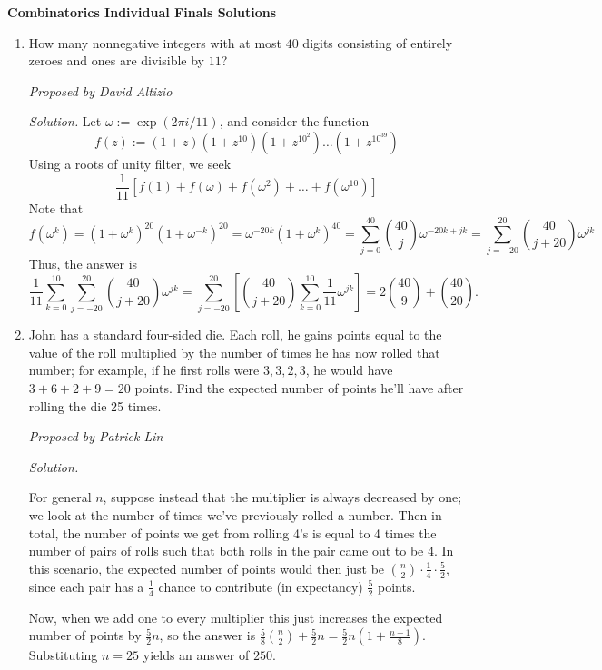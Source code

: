\documentclass[10pt]{article}
\newcommand{\proposed}[1]
{
\vspace{3pt}
\noindent\textit{Proposed by #1}
}
\newcommand{\solution}
{
\vspace{3pt}
\noindent\textit{Solution.}\qquad
}
\begin{document}
\newpage

\begin{center}
\huge\textbf{Combinatorics Individual Finals Solutions}
\end{center} \vspace{3pt}

\begin{enumerate}

\item How many nonnegative integers with at most $40$ digits consisting of entirely zeroes and ones are divisible by $11$?

\proposed{David Altizio}

\solution Let $\omega:=\exp(2\pi i/11)$, and consider the function \[f(z):=(1+z)(1+z^{10})(1+z^{10^2})\dots(1+z^{10^{39}})\] Using a roots of unity filter, we seek \[\frac1{11}\left[f(1)+f(\omega)+f(\omega^2)+\dots+f(\omega^{10})\right]\] Note that \[f(\omega^k)=(1+\omega^k)^{20}(1+\omega^{-k})^{20}=\omega^{-20k}(1+\omega^k)^{40}=\sum_{j=0}^{40}\binom{40}j\omega^{-20k+jk}=\sum_{j=-20}^{20}\binom{40}{j+20}\omega^{jk}\] Thus, the answer is \[\frac1{11}\sum_{k=0}^{10}\sum_{j=-20}^{20}\binom{40}{j+20}\omega^{jk}=\sum_{j=-20}^{20}\left[\binom{40}{j+20}\sum_{k=0}^{10}\frac1{11}\omega^{jk}\right]=\boxed{2\binom{40}{9}+\binom{40}{20}}.\]

\item John has a standard four-sided die. Each roll, he gains points equal to the value of the roll multiplied by the number of times he has now rolled that number; for example, if he first rolls were $3,3,2,3$, he would have $3+6+2+9=20$ points. Find the expected number of points he'll have after rolling the die 25 times.

\proposed{Patrick Lin}

\solution
For general $n$, suppose instead that the multiplier is always decreased by one; we look at the number of times we've previously rolled a number. Then in total, the number of points we get from rolling 4's is equal to 4 times the number of pairs of rolls such that both rolls in the pair came out to be 4. In this scenario, the expected number of points would then just be $\binom{n}{2}\cdot\frac{1}{4}\cdot\frac{5}{2}$, since each pair has a $\frac14$ chance to contribute (in expectancy) $\frac52$ points.

\par Now, when we add one to every multiplier this just increases the expected number of points by $\frac52 n$, so the answer is $\frac58\binom{n}{2} + \frac52 n = \frac52 n \left(1 + \frac{n-1}{8}\right)$. Substituting $n = 25$ yields an answer of $\boxed{250}$.


\end{enumerate}
\end{document}
